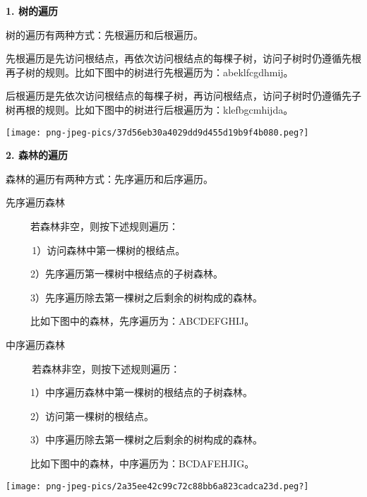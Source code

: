 {\textbf{1. 树的遍历}}{}

{树的遍历有两种方式：先根遍历和后根遍历。}

{{先根遍历}是先访问根结点，再依次访问根结点的每棵子树，访问子树时仍遵循先根再子树的规则。比如下图中的树进行先根遍历为：abeklfcgdhmij。}{}

{{后根遍历}是先依次访问根结点的每棵子树，再访问根结点，访问子树时仍遵循先子树再根的规则。比如下图中的树进行后根遍历为：klefbgcmhijda。}{}

{\texttt{[image: png-jpeg-pics/37d56eb30a4029dd9d455d19b9f4b080.peg?]}}

{\textbf{2. 森林的遍历}}

{森林的遍历有两种方式：先序遍历和后序遍历。}

{先序遍历森林}

{~ ~ ~ 若森林非空，则按下述规则遍历：}

{~ ~ ~~1）访问森林中第一棵树的根结点。}

{~ ~ ~ 2）先序遍历第一棵树中根结点的子树森林。}

{~ ~ ~ 3）先序遍历除去第一棵树之后剩余的树构成的森林。}

{~ ~ ~ 比如下图中的森林，先序遍历为：ABCDEFGHIJ。}

{中序遍历森林}

{~ ~ ~~若森林非空，则按下述规则遍历：}

{~ ~ ~ 1）中序遍历森林中第一棵树的根结点的子树森林。}

{~ ~ ~ 2）访问第一棵树的根结点。}

{~ ~ ~ 3）中序遍历除去第一棵树之后剩余的树构成的森林。}

{~ ~ ~ 比如下图中的森林，中序遍历为：BCDAFEHJIG。}

{\texttt{[image: png-jpeg-pics/2a35ee42c99c72c88bb6a823cadca23d.peg?]}}

